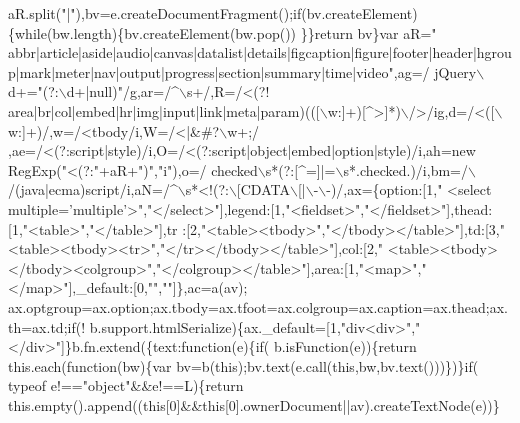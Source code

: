 \begin{DoxyCode}
{      aR.split(\textcolor{stringliteral}{"|"}),bv=e.createDocumentFragment();\textcolor{keywordflow}{if}(bv.createElement)\{\textcolor{keywordflow}{while}(bw.length)\{bv.createElement(bw.pop())
      \}\}\textcolor{keywordflow}{return} bv\}var aR=\textcolor{stringliteral}{"
      abbr|article|aside|audio|canvas|datalist|details|figcaption|figure|footer|header|hgroup|mark|meter|nav|output|progress|section|summary|time|video"},ag=/ jQuery\(\backslash\)d+=\textcolor{stringliteral}{"(?:\(\backslash\)d+|null)"}/g,ar=/^\(\backslash\)s+/,R=/<(?!
      area|br|col|embed|hr|img|input|link|meta|param)(([\(\backslash\)w:]+)[^>]*)\(\backslash\)/>/ig,d=/<([\(\backslash\)w:]+)/,w=/<tbody/i,W=/<|&#?\(\backslash\)w+;/
      ,ae=/<(?:script|style)/i,O=/<(?:script|\textcolor{keywordtype}{object}|embed|option|style)/i,ah=\textcolor{keyword}{new} RegExp(\textcolor{stringliteral}{"<(?:"}+aR+\textcolor{stringliteral}{")"},\textcolor{stringliteral}{"i"}),o=/
      checked\(\backslash\)s*(?:[^=]|=\(\backslash\)s*.checked.)/i,bm=/\(\backslash\)/(java|ecma)script/i,aN=/^\(\backslash\)s*<!(?:\(\backslash\)[CDATA\(\backslash\)[|\(\backslash\)-\(\backslash\)-)/,ax=\{option:[1,\textcolor{stringliteral}{"
      <select multiple='multiple'>"},\textcolor{stringliteral}{"</select>"}],legend:[1,\textcolor{stringliteral}{"<fieldset>"},\textcolor{stringliteral}{"</fieldset>"}],thead:[1,\textcolor{stringliteral}{"<table>"},\textcolor{stringliteral}{"</table>"}],tr
      :[2,\textcolor{stringliteral}{"<table><tbody>"},\textcolor{stringliteral}{"</tbody></table>"}],td:[3,\textcolor{stringliteral}{"<table><tbody><tr>"},\textcolor{stringliteral}{"</tr></tbody></table>"}],col:[2,\textcolor{stringliteral}{"
      <table><tbody></tbody><colgroup>"},\textcolor{stringliteral}{"</colgroup></table>"}],area:[1,\textcolor{stringliteral}{"<map>"},\textcolor{stringliteral}{"</map>"}],\_default:[0,\textcolor{stringliteral}{""},\textcolor{stringliteral}{""}]\},ac=a(av);
ax.optgroup=ax.option;ax.tbody=ax.tfoot=ax.colgroup=ax.caption=ax.thead;ax.th=ax.td;\textcolor{keywordflow}{if}(!
      b.support.htmlSerialize)\{ax.\_default=[1,\textcolor{stringliteral}{"div<div>"},\textcolor{stringliteral}{"</div>"}]\}b.fn.extend(\{text:\textcolor{keyword}{function}(e)\{\textcolor{keywordflow}{if}(
      b.isFunction(e))\{\textcolor{keywordflow}{return} this.each(\textcolor{keyword}{function}(bw)\{var bv=b(\textcolor{keyword}{this});bv.text(e.call(\textcolor{keyword}{this},bw,bv.text()))\})\}\textcolor{keywordflow}{if}(
      typeof e!==\textcolor{stringliteral}{"object"}&&e!==L)\{\textcolor{keywordflow}{return} this.empty().append((\textcolor{keyword}{this}[0]&&\textcolor{keyword}{this}[0].ownerDocument||av).createTextNode(e))\}\textcolor{keywordflow}{
}}
\end{DoxyCode}
